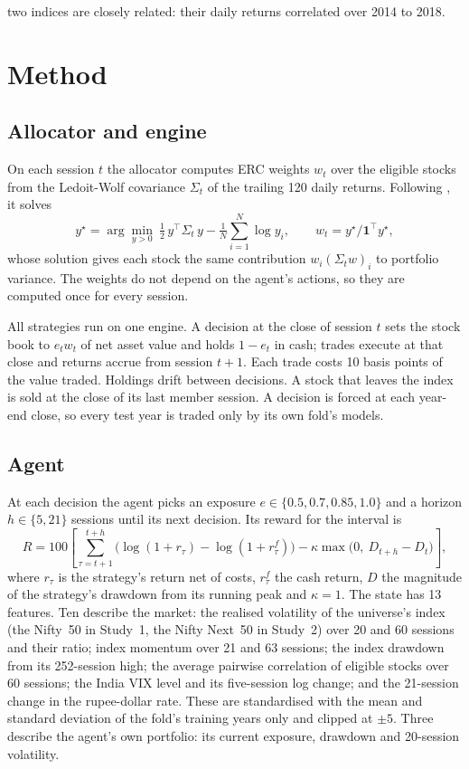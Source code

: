 \documentclass[11pt]{article}
\begin{document}
two indices are closely related: their daily returns correlated \NxCorrDev{} over 2014 to 2018.

\section{Method}\label{sec:method}

\subsection{Allocator and engine}

On each session $t$ the allocator computes ERC weights $w_t$ over the eligible stocks from the Ledoit-Wolf covariance $\Sigma_t$ of the trailing 120 daily returns. Following \citet{spinu2013}, it solves
\begin{equation}
y^\star = \arg\min_{y>0}\ \tfrac{1}{2}\,y^\top \Sigma_t\, y - \tfrac{1}{N}\sum_{i=1}^{N} \log y_i, \qquad w_t = y^\star / \mathbf{1}^\top y^\star,
\end{equation}
whose solution gives each stock the same contribution $w_i(\Sigma_t w)_i$ to portfolio variance. The weights do not depend on the agent's actions, so they are computed once for every session.

All strategies run on one engine. A decision at the close of session $t$ sets the stock book to $e_t w_t$ of net asset value and holds $1-e_t$ in cash; trades execute at that close and returns accrue from session $t+1$. Each trade costs 10 basis points of the value traded. Holdings drift between decisions. A stock that leaves the index is sold at the close of its last member session. A decision is forced at each year-end close, so every test year is traded only by its own fold's models.

\subsection{Agent}

At each decision the agent picks an exposure $e \in \{0.5, 0.7, 0.85, 1.0\}$ and a horizon $h \in \{5, 21\}$ sessions until its next decision. Its reward for the interval is
\begin{equation}
R = 100\left[\sum_{\tau=t+1}^{t+h} \bigl(\log(1+r_\tau) - \log(1+r^f_\tau)\bigr) - \kappa \max\bigl(0,\ D_{t+h} - D_t\bigr)\right],
\end{equation}
where $r_\tau$ is the strategy's return net of costs, $r^f_\tau$ the cash return, $D$ the magnitude of the strategy's drawdown from its running peak and $\kappa=1$. The state has 13 features. Ten describe the market: the realised volatility of the universe's index (the Nifty~50 in Study~1, the Nifty Next~50 in Study~2) over 20 and 60 sessions and their ratio; index momentum over 21 and 63 sessions; the index drawdown from its 252-session high; the average pairwise correlation of eligible stocks over 60 sessions; the India VIX level and its five-session log change; and the 21-session change in the rupee-dollar rate. These are standardised with the mean and standard deviation of the fold's training years only and clipped at $\pm 5$. Three describe the agent's own portfolio: its current exposure, drawdown and 20-session volatility.
\end{document}

